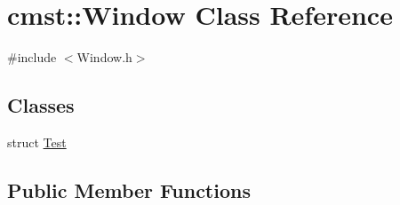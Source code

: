 \hypertarget{classcmst_1_1_window}{}\section{cmst\+:\+:Window Class Reference}
\label{classcmst_1_1_window}


{\ttfamily \#include $<$Window.\+h$>$}

\subsection*{Classes}
\begin{DoxyCompactItemize}
\item 
struct \hyperlink{structcmst_1_1_window_1_1_test}{Test}
\end{DoxyCompactItemize}
\subsection*{Public Member Functions}
